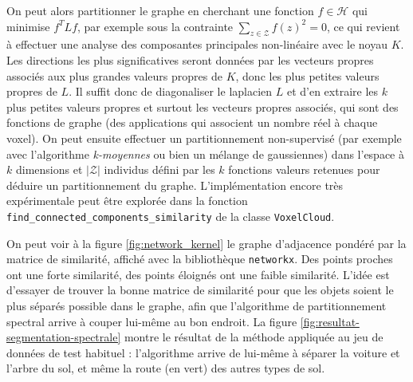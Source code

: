 \documentclass[a4paper, onecolumn, 11pt]{article}
\begin{document}
On peut alors partitionner le graphe en cherchant une fonction $f\in\mathcal{H}$ qui minimise $f^TLf$, par exemple sous la contrainte $\sum_{z\in\mathcal{Z}}f(z)^2=0$, ce qui revient à effectuer une analyse des composantes principales non-linéaire avec le noyau $K$. Les directions les plus significatives seront données par les vecteurs propres associés aux plus grandes valeurs propres de $K$, donc les plus petites valeurs propres de $L$. Il suffit donc de diagonaliser le laplacien $L$ et d'en extraire les $k$ plus petites valeurs propres et surtout les vecteurs propres associés, qui sont des fonctions de graphe (des applications qui associent un nombre réel à chaque voxel). On peut ensuite effectuer un partitionnement non-supervisé (par exemple avec l'algorithme \emph{k-moyennes} ou bien un mélange de gaussiennes) dans l'espace à $k$ dimensions et $|\mathcal{Z}|$ individus défini par les $k$ fonctions valeurs retenues pour déduire un partitionnement du graphe. L'implémentation encore très expérimentale peut être explorée dans la fonction \texttt{find\_connected\_components\_similarity} de la classe \texttt{VoxelCloud}.

On peut voir à la figure \ref{fig:network_kernel} le graphe d'adjacence pondéré par la matrice de similarité, affiché avec la bibliothèque \texttt{networkx}. Des points proches ont une forte similarité, des points éloignés ont une faible similarité. L'idée est d'essayer de trouver la bonne matrice de similarité pour que les objets soient le plus séparés possible dans le graphe, afin que l'algorithme de partitionnement spectral arrive à couper lui-même au bon endroit. La figure \ref{fig:resultat-segmentation-spectrale} montre le résultat de la méthode appliquée au jeu de données de test habituel : l'algorithme arrive de lui-même à séparer la voiture et l'arbre du sol, et même la route (en vert) des autres types de sol.
\end{document}

